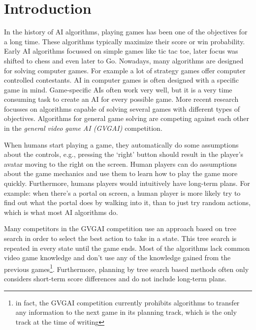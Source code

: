 \section{Introduction}
\label{sec:introduction}
In the history of AI algorithms, playing games has been one of the objectives
for a long time. These algorithms typically maximize their score or win
probability. Early AI algorithms focussed on simple games like tic tac toe,
later focus was shifted to chess and even later to Go. Nowadays, many
algorithms are designed for solving computer games. For example a lot of
strategy games offer computer controlled contestants. AI in computer games is
often designed with a specific game in mind.  
Game-specific AIs often work very well, but it is a very time consuming
task to create an AI for every possible game. More recent research focusses
on algorithms capable of solving several games with different types of
objectives. Algorithms for general game solving are competing against each other
in the \emph{general video game AI (GVGAI)} competition\cite{perez2014}. 

When humans start playing a game, they automatically do some assumptions about
the controls, e.g., pressing the `right' button should result in the player's
avatar moving to the right on the screen. Human players can do
assumptions about the game mechanics and use them to learn how to play the game
more quickly. Furthermore, humans players would intuitively have long-term
plans.  For example: when there's a portal on screen, a human player is more
likely try to find out what the portal does by walking into it, than to just try
random actions, which is what most AI algorithms do.

Many competitors in the GVGAI competition use an approach based on tree
search in order to select the best action to take in a state. This tree search
is repeated in every state until the game ends. Most of the algorithms lack
common video game knowledge and don't use any of the knowledge gained from the
previous games\footnote{in fact, the GVGAI competition currently prohibits algorithms to
transfer any information to the next game in its planning track, which is the
only track at the time of writing}. Furthermore, planning by tree search based
methods often only considers short-term score differences and do not include
long-term plans.

